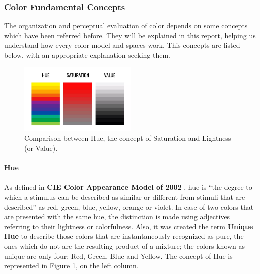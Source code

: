 \subsubsection{Color Fundamental Concepts}
The organization and perceptual evaluation of color depends on some concepts which have been referred
before. They will be explained in this report, helping us understand how every color model and spaces work.
This concepts are listed below, with an appropriate explanation seeking them.
%
\begin{figure}[H]
  \centering
  \vspace{-10pt}
  \includegraphics[width=0.5\textwidth]{images/background/Hue_Saturation_value.png}
  \caption[Hue, Saturation and Value Comparison]{Comparison between Hue, the concept of Saturation and Lightness (or Value).\protect\footnotemark{}}
  \vspace{-25pt}
  \label{fig:hsvconcepts}
\end{figure}
%
\paragraph{\underline{Hue}} As defined in \textbf{CIE Color Appearance Model of 2002} \cite{Moroney2002}, hue is
“the degree to which a stimulus can be described as similar or different from stimuli that are described”
as red, green, blue, yellow, orange or violet. In case of two colors that are presented with the same hue, the
distinction is made using adjectives referring to their lightness or colorfulness. Also, it was created the
term \textbf{Unique Hue} to describe those colors that are instantaneously recognized as pure, the ones which do
not are the resulting product of a mixture; the colors known as unique are only four: Red, Green, Blue
and Yellow. The concept of Hue is represented in Figure \ref{fig:hsvconcepts}, on the left column.
%
